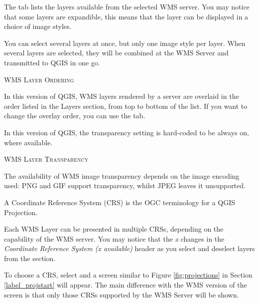  \label{ogc-wms-layers}

The  tab lists the layers available from the selected
WMS server.  You may notice that some layers are expandible, this means
that the layer can be displayed in a choice of image styles.

You can select several layers at once, but only one image style per layer.
When several layers are selected, they will be combined at the WMS Server
and transmitted to QGIS in one go.

\begin{Tip}[ht]\caption{\textsc{WMS Layer Ordering}}
In this version of QGIS, WMS layers rendered by a server are overlaid
in the order listed in the Layers section, from top to bottom of the list.
If you want to change the overlay order, you can use the  tab.
\end{Tip}

\label{ogc-wms-transparency}

In this version of QGIS, the transparency setting is hard-coded to
be always on, where available.

\begin{Tip}[ht]\caption{\textsc{WMS Layer Transparency}}
The availability of WMS image transparency depends on
the image encoding used:  PNG and GIF support transparency,
whilst JPEG leaves it unsupported.
\end{Tip}


A Coordinate Reference System (CRS) is the OGC terminology for a QGIS Projection.

Each WMS Layer can be presented in multiple CRSs, depending
on the capability of the WMS server.  You may notice that the \textsl{x} changes in
the \textsl{Coordinate Reference System (x available)} header as you
select and deselect layers from the  section.

To choose a CRS, select  and a screen similar to
Figure \ref{fig:projections} in Section \ref{label_projstart} will appear.
The main difference with the WMS version of the screen is that only
those CRSs supported by the WMS Server will be shown.


